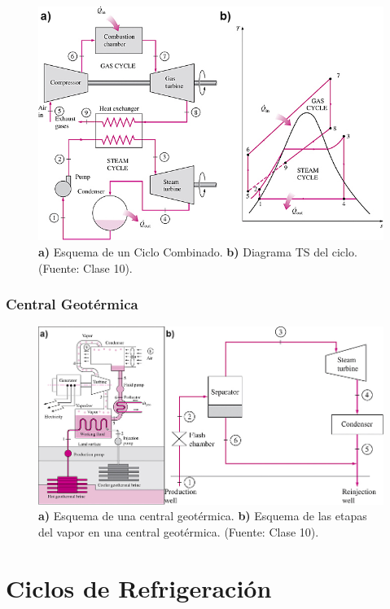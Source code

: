             \begin{figure}
                \includegraphics[width=.7\textwidth]{img/clases/ciclo_combinado.png}
                \caption[Ciclo Combinado]{\textbf{a)} Esquema de un Ciclo Combinado. \textbf{b)} Diagrama TS del ciclo. (Fuente: Clase 10).}
                \label{fig:ciclo_combinado}
            \end{figure}
        
        \subsubsection{Central Geotérmica}
        
        \begin{figure}
            \includegraphics[width=\textwidth]{img/clases/esquema_central_geotermica.png}
            \caption[Central Geotérmica (Fuente: Clase 10)]{\textbf{a)} Esquema de una central geotérmica. \textbf{b)} Esquema de las etapas del vapor en una central geotérmica. (Fuente: Clase 10).}
            \label{fig:central_geotermica}
        \end{figure}

\section{Ciclos de Refrigeración}

